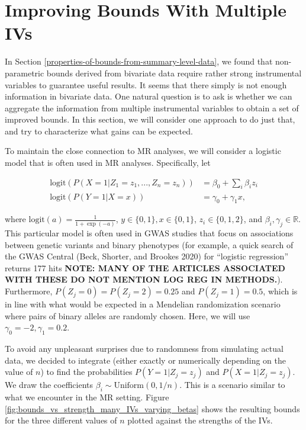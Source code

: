 \documentclass[
]{article}
\theoremstyle{plain}
\begin{document}
\hypertarget{improving-bounds-with-multiple-ivs}{%
\section{Improving Bounds With Multiple IVs}\label{improving-bounds-with-multiple-ivs}}

In Section \ref{properties-of-bounds-from-summary-level-data}, we found that non-parametric bounds derived from bivariate data require rather strong instrumental variables to guarantee useful results. It seems that there simply is not enough information in bivariate data. One natural question is to ask is whether we can aggregate the information from multiple instrumental variables to obtain a set of improved bounds. In this section, we will consider one approach to do just that, and try to characterize what gains can be expected.

To maintain the close connection to MR analyses, we will consider a logistic model that is often used in MR analyses. Specifically, let

\[\begin{aligned}
\text{logit}(P(X = 1 | Z_1 = z_1, ..., Z_n = z_n)) &= \beta_0 + \sum_i \beta_i z_i \\
\text{logit}(P(Y = 1 | X = x)) &= \gamma_0 + \gamma_1 x,
\end{aligned}\]

where \(\text{logit}(a) = \frac{1}{1 + \exp(-a)}\), \(y \in \{0,1\}, x \in \{0,1\}\), \(z_i \in \{0, 1, 2\}\), and \(\beta_i, \gamma_j \in \mathbb{R}\). This particular model is often used in GWAS studies that focus on associations between genetic variants and binary phenotypes (for example, a quick search of the GWAS Central (Beck, Shorter, and Brookes 2020) for ``logistic regression'' returns 177 hits \textbf{NOTE: MANY OF THE ARTICLES ASSOCIATED WITH THESE DO NOT MENTION LOG REG IN METHODS.}). Furthermore, \(P(Z_j = 0) = P(Z_j = 2) = 0.25\) and \(P(Z_j = 1) = 0.5\), which is in line with what would be expected in a Mendelian randomization scenario where pairs of binary alleles are randomly chosen. Here, we will use \(\gamma_0 = -2, \gamma_1 = 0.2\).

To avoid any unpleasant surprises due to randomness from simulating actual data, we decided to integrate (either exactly or numerically depending on the value of \(n\)) to find the probabilities \(P(Y = 1 | Z_j = z_j)\) and \(P(X = 1 | Z_j = z_j)\). We draw the coefficients \(\beta_i \sim \text{Uniform}(0, 1/n)\). This is a scenario similar to what we encounter in the MR setting. Figure \ref{fig:bounds_vs_strength_many_IVs_varying_betas} shows the resulting bounds for the three different values of \(n\) plotted against the strengths of the IVs.
\end{document}

